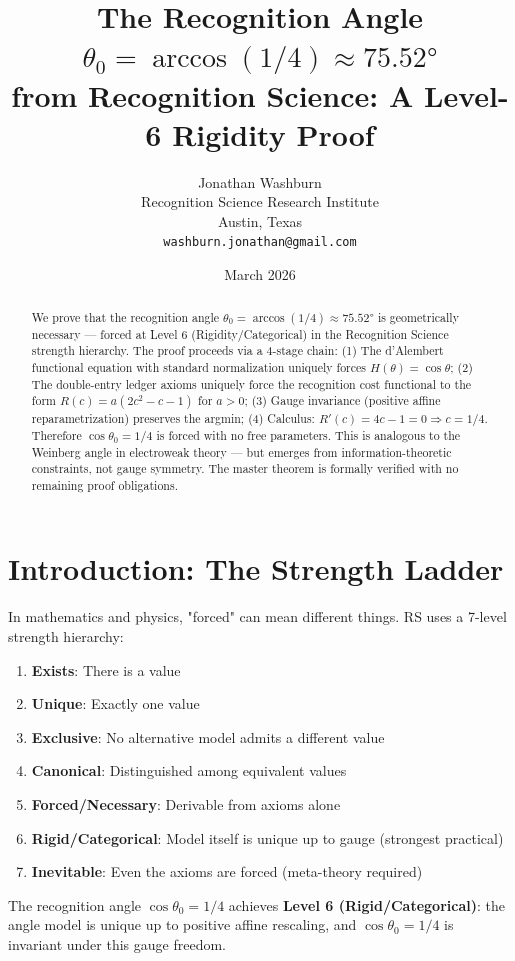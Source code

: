 \documentclass[12pt,a4paper]{article}
\title{The Recognition Angle $\theta_0 = \arccos(1/4) \approx 75.52°$\\
from Recognition Science: A Level-6 Rigidity Proof}
\author{Jonathan Washburn\\
Recognition Science Research Institute\\
Austin, Texas\\
\texttt{washburn.jonathan@gmail.com}}
\date{March 2026}
\theoremstyle{definition}
\theoremstyle{remark}
\begin{document}
\maketitle

\begin{abstract}
We prove that the recognition angle $\theta_0 = \arccos(1/4) \approx 75.52°$ is 
geometrically necessary — forced at Level 6 (Rigidity/Categorical) in the Recognition 
Science strength hierarchy. The proof proceeds via a 4-stage chain:
(1) The d'Alembert functional equation with standard normalization uniquely forces 
$H(\theta) = \cos\theta$;
(2) The double-entry ledger axioms uniquely force the recognition cost functional 
to the form $R(c) = a(2c^2 - c - 1)$ for $a > 0$;
(3) Gauge invariance (positive affine reparametrization) preserves the argmin;
(4) Calculus: $R'(c) = 4c - 1 = 0 \Rightarrow c = 1/4$.
Therefore $\cos\theta_0 = 1/4$ is forced with no free parameters.
This is analogous to the Weinberg angle in electroweak theory — but emerges from 
information-theoretic constraints, not gauge symmetry.
The master theorem is formally verified with no remaining proof obligations.
\end{abstract}

\section{Introduction: The Strength Ladder}

In mathematics and physics, "forced" can mean different things. RS uses a 7-level 
strength hierarchy:
\begin{enumerate}
\item \textbf{Exists}: There is a value
\item \textbf{Unique}: Exactly one value
\item \textbf{Exclusive}: No alternative model admits a different value
\item \textbf{Canonical}: Distinguished among equivalent values
\item \textbf{Forced/Necessary}: Derivable from axioms alone
\item \textbf{Rigid/Categorical}: Model itself is unique up to gauge (strongest practical)
\item \textbf{Inevitable}: Even the axioms are forced (meta-theory required)
\end{enumerate}

The recognition angle $\cos\theta_0 = 1/4$ achieves \textbf{Level 6 (Rigid/Categorical)}: 
the angle model is unique up to positive affine rescaling, and $\cos\theta_0 = 1/4$ 
is invariant under this gauge freedom.
\end{document}
